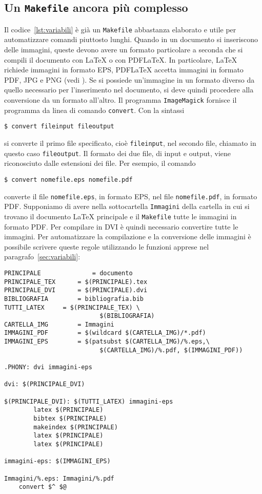 \subsection{Un \texttt{Makefile} ancora più complesso}
\label{sec:make-complesso}

Il codice~\ref{lst:variabili} è già un \texttt{Makefile} abbastanza elaborato e
utile per automatizzare comandi piuttosto lunghi.  Quando in un documento si
inseriscono delle immagini, queste devono avere un formato particolare a seconda
che si compili il documento con \LaTeX{}
o con \textsc{PDF}\LaTeX.  In particolare, \LaTeX{}
richiede immagini in formato \textsc{EPS}, \textsc{PDF}\LaTeX{}
accetta immagini in formato \textsc{PDF}, \textsc{JPG} e \textsc{PNG} (vedi
\textcite[105]{pantieri:latex}).  Se si possiede un'immagine in un formato
diverso da quello necessario per l'inserimento nel documento, si deve quindi
procedere alla conversione da un formato all'altro.  Il programma
\texttt{ImageMagick} fornisce il programma da linea di comando
\texttt{convert}. Con la sintassi
\begin{verbatim}
$ convert fileinput fileoutput
\end{verbatim} %
si converte il primo file specificato, cioè \texttt{fileinput}, nel secondo
file, chiamato in questo caso \texttt{fileoutput}.  Il formato dei due file, di
input e output, viene riconosciuto dalle estensioni dei file.  Per esempio, il
comando
\begin{verbatim}
$ convert nomefile.eps nomefile.pdf
\end{verbatim} %
converte il file \texttt{nomefile.eps}, in formato \textsc{EPS}, nel file
\texttt{nomefile.pdf}, in formato \textsc{PDF}.  Supponiamo di avere nella
sottocartella \texttt{Immagini} della cartella in cui si trovano il documento
\LaTeX{}
principale e il \texttt{Makefile} tutte le immagini in formato \textsc{PDF}.
Per compilare in \textsc{DVI} è quindi necessario convertire tutte le immagini.
Per automatizzare la compilazione e la conversione delle immagini è possibile
scrivere queste regole utilizzando le funzioni apprese nel
paragrafo~\ref{sec:variabili}:
\begin{lstlisting}[caption={\texttt{Makefile} in cui le immagini \textsc{PDF}
vengono convertite in \textsc{EPS} nella compilazione con \LaTeX.},label=lst:pdf-eps]
PRINCIPALE              = documento
PRINCIPALE_TEX		= $(PRINCIPALE).tex
PRINCIPALE_DVI		= $(PRINCIPALE).dvi
BIBLIOGRAFIA		= bibliografia.bib
TUTTI_LATEX		= $(PRINCIPALE_TEX) \
                          $(BIBLIOGRAFIA)
CARTELLA_IMG		= Immagini
IMMAGINI_PDF		= $(wildcard $(CARTELLA_IMG)/*.pdf)
IMMAGINI_EPS		= $(patsubst $(CARTELLA_IMG)/%.eps,\
                          $(CARTELLA_IMG)/%.pdf, $(IMMAGINI_PDF))

.PHONY: dvi immagini-eps

dvi: $(PRINCIPALE_DVI)

$(PRINCIPALE_DVI): $(TUTTI_LATEX) immagini-eps
        latex $(PRINCIPALE)
        bibtex $(PRINCIPALE)
        makeindex $(PRINCIPALE)
        latex $(PRINCIPALE)
        latex $(PRINCIPALE)

immagini-eps: $(IMMAGINI_EPS)

Immagini/%.eps: Immagini/%.pdf
	convert $^ $@
\end{lstlisting} %
